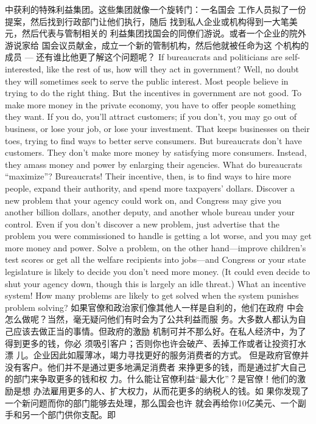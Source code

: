 \begin{paracol}{2}
中获利的特殊利益集团。这些集团就像一个旋转门：一名国会
工作人员拟了一份提案，然后找到行政部门让他们执行，随后
找到私人企业或机构得到一大笔美元，然后代表与管制相关的
利益集团找国会的同僚们游说。或者一个企业的院外游说家给
国会议员献金，成立一个新的管制机构，然后他就被任命为这
个机构的成员 --- 还有谁比他更了解这个问题呢？
\switchcolumn*
If bureaucrats and politicians are self-interested, like the rest
of us, how will they act in government? Well, no doubt they
will sometimes seek to serve the public interest. Most people
believe in trying to do the right thing. But the incentives in
government are not good. To make more money in the private
economy, you have to offer people something they want. If you
do, you'll attract customers; if you don't, you may go out of
business, or lose your job, or lose your investment. That keeps
businesses on their toes, trying to find ways to better serve consumers. But bureaucrats don't have customers. They don't
make more money by satisfying more consumers. Instead, they
amass money and power by enlarging their agencies. What do
bureaucrats ``maximize''? Bureaucrats! Their incentive, then, is
to find ways to hire more people, expand their authority, and
spend more taxpayers' dollars. Discover a new problem that
your agency could work on, and Congress may give you another billion dollars, another deputy, and another whole bureau under
your control. Even if you don't discover a new problem, just advertise that the problem you were commissioned to handle is
getting a lot worse, and you may get more money and power.
Solve a problem, on the other hand---improve children's test
scores or get all the welfare recipients into jobs---and Congress
or your state legislature is likely to decide you don't need more
money. (It could even decide to shut your agency down, though
this is largely an idle threat.) What an incentive system! How
many problems are likely to get solved when the system punishes problem solving?
\switchcolumn
如果官僚和政治家们像其他人一样是自利的，他们在政府
中会怎么做呢？当然，毫无疑问他们有时会为了公共利益而服
务。大多数人都认为自己应该去做正当的事情。但政府的激励
机制可并不那么好。在私人经济中，为了得到更多的钱，你必
须吸引客户；否则你也许会破产、丢掉工作或者让投资打水漂
儿。企业因此如履薄冰，竭力寻找更好的服务消费者的方式。
但是政府官僚并没有客户。他们并不是通过更多地满足消费者
来挣更多的钱，而是通过扩大自己的部门来争取更多的钱和权
力。什么能让官僚利益“最大化”？是官僚！他们的激励是想
办法雇用更多的人、扩大权力，从而花更多的纳税人的钱。如
果你发现了一个新问题而你的部门能够去处理，那么国会也许
就会再给你10亿美元、一个副手和另一个部门供你支配。即

\end{paracol}
